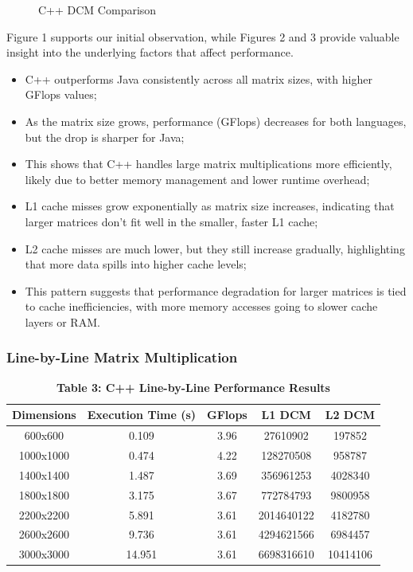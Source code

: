 \documentclass{article}
\begin{document}
\begin{figure}[H]
\begin{minipage}{0.32\textwidth}
        \caption{\small C++ DCM Comparison}
        \label{fig:cache_misses}
    \end{minipage}
\end{figure}

Figure 1 supports our initial observation, while Figures 2 and 3 provide valuable insight into the underlying factors that affect performance.

\begin{itemize}
    \item C++ outperforms Java consistently across all matrix sizes, with higher GFlops values;
    \item As the matrix size grows, performance (GFlops) decreases for both languages, but the drop is sharper for Java;
    \item This shows that C++ handles large matrix multiplications more efficiently, likely due to better memory management and lower runtime overhead;
    \item L1 cache misses grow exponentially as matrix size increases, indicating that larger matrices don't fit well in the smaller, faster L1 cache;
    \item L2 cache misses are much lower, but they still increase gradually, highlighting that more data spills into higher cache levels;
    \item This pattern suggests that performance degradation for larger matrices is tied to cache inefficiencies, with more memory accesses going to slower cache layers or RAM.
\end{itemize}

\subsubsection{Line-by-Line Matrix Multiplication}

\begin{table}[H]
\centering
\caption*{\textbf{ Table 3: C++ Line-by-Line Performance Results}}

\begin{tabular}{||c | c | c | c | c||} 
 \hline
 \textbf{Dimensions} & \textbf{Execution Time (s)} & \textbf{GFlops} & \textbf{L1 DCM} & \textbf{L2 DCM} \\  
 \hline \hline
 600x600  & 0.109   & 3.96   & 27610902   & 197852    \\  
 \hline
 1000x1000 & 0.474   & 4.22   & 128270508 & 958787  \\  
 \hline
 1400x1400 & 1.487   & 3.69   & 356961253 & 4028340 \\  
 \hline
 1800x1800 & 3.175   & 3.67   & 772784793 & 9800958 \\  
 \hline
 2200x2200 & 5.891   & 3.61   & 2014640122 & 4182780 \\  
 \hline
 2600x2600 & 9.736   & 3.61   & 4294621566 & 6984457 \\  
 \hline
 3000x3000 & 14.951  & 3.61   & 6698316610 & 10414106 \\  
 \hline
\end{tabular}
\end{table}
\end{document}
